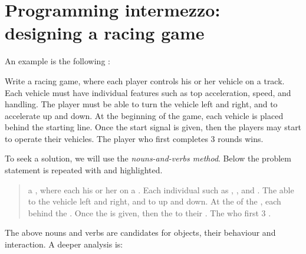 \section{Programming intermezzo: designing a racing game}
An example is the following :
%
\begin{problem}
  Write a racing game, where each player controls his or her vehicle on a track. Each vehicle must have individual features such as top acceleration, speed, and handling. The player must be able to turn the vehicle left and right, and to accelerate up and down. At the beginning of the game, each vehicle is placed behind the starting line. Once the start signal is given, then the players may start to operate their vehicles. The player who first completes 3 rounds wins.
\end{problem}
%
To seek a solution, we will use the \emph{nouns-and-verbs method}. Below the problem statement is repeated with  and  highlighted.
\begin{quote}
   a , where each   his or her  on a . Each   individual  such as , , and . The   able to  the vehicle left and right, and to  up and down. At the  of the , each   behind the . Once the  is given, then the   to  their . The  who first  3  .
\end{quote}
The above nouns and verbs are candidates for objects, their behaviour and interaction. A deeper analysis is:

